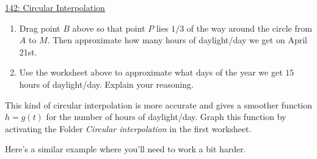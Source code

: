 \documentclass{ximera}
\begin{document}
\begin{example}
 
\begin{onlineOnly}
    \begin{center}
\end{center}
\end{onlineOnly}

\href{https://www.desmos.com/calculator/nfsifbppzz}{142: Circular Interpolation}

\begin{enumerate}
\item Drag point $B$ above so that point $P$ lies $1/3$ of the way around the circle from $A$ to $M$. Then approximate how many hours of daylight/day we get on April 21st.
\begin{freeResponse} 
\end{freeResponse}

\item Use the worksheet above to approximate what days of the year we get $15$ hours of daylight/day. Explain your reasoning.
\begin{freeResponse}
\end{freeResponse}
\end{enumerate}

This kind of circular interpolation is more accurate and gives a smoother function $h=g(t)$ for the number of hours of daylight/day. Graph this function by activating the Folder \emph{Circular interpolation} in the first worksheet.

\end{example}


\fi

Here's a similar example where you'll need to work a bit harder.
\end{document}
